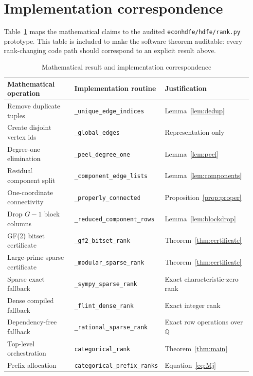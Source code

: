 \documentclass[11pt]{article}
\theoremstyle{definition}
\newcommand{\Q}{\mathbb{Q}}
\newcommand{\1}{\mathbf{1}}
\begin{document}
\section{Implementation correspondence}

Table~\ref{tab:code} maps the mathematical claims to the audited \texttt{econhdfe/hdfe/rank.py} prototype. This table is included to make the software theorem auditable: every rank-changing code path should correspond to an explicit result above.

\begin{table}[htbp]
\centering
\caption{Mathematical result and implementation correspondence}
\label{tab:code}
\begin{tabular}{p{}p{}p{}}
\toprule
Mathematical operation & Implementation routine & Justification \\
\midrule
Remove duplicate tuples & \texttt{\_unique\_edge\_indices} & Lemma~\ref{lem:dedup} \\
Create disjoint vertex ids & \texttt{\_global\_edges} & Representation only \\
Degree-one elimination & \texttt{\_peel\_degree\_one} & Lemma~\ref{lem:peel} \\
Residual component split & \texttt{\_component\_edge\_lists} & Lemma~\ref{lem:components} \\
One-coordinate connectivity & \texttt{\_properly\_connected} & Proposition~\ref{prop:proper} \\
Drop $G-1$ block columns & \texttt{\_reduced\_component\_rows} & Lemma~\ref{lem:blockdrop} \\
GF(2) bitset certificate & \texttt{\_gf2\_bitset\_rank} & Theorem~\ref{thm:certificate} \\
Large-prime sparse certificate & \texttt{\_modular\_sparse\_rank} & Theorem~\ref{thm:certificate} \\
Sparse exact fallback & \texttt{\_sympy\_sparse\_rank} & Exact characteristic-zero rank \\
Dense compiled fallback & \texttt{\_flint\_dense\_rank} & Exact integer rank \\
Dependency-free fallback & \texttt{\_rational\_sparse\_rank} & Exact row operations over $\Q$ \\
Top-level orchestration & \texttt{categorical\_rank} & Theorem~\ref{thm:main} \\
Prefix allocation & \texttt{categorical\_prefix\_ranks} & Equation~\eqref{eq:Mj} \\
\bottomrule
\end{tabular}
\end{table}
\end{document}
